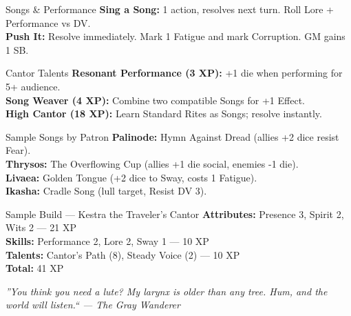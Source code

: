 \documentclass[10pt]{article}
\begin{document}
\begin{minipage}[t]{0.48\linewidth}
    \begin{charbox}{Songs \& Performance}
        \textbf{Sing a Song:} 1 action, resolves next turn. Roll Lore + Performance vs DV.\\
        \textbf{Push It:} Resolve immediately. Mark 1 Fatigue and mark Corruption. GM gains 1 SB.
    \end{charbox}
    
    \vspace{0.5em}
    
    \begin{charbox}{Cantor Talents}
        \textbf{Resonant Performance (3 XP):} +1 die when performing for 5+ audience.\\
        \textbf{Song Weaver (4 XP):} Combine two compatible Songs for +1 Effect.\\
        \textbf{High Cantor (18 XP):} Learn Standard Rites as Songs; resolve instantly.
    \end{charbox}
    
    \vspace{0.5em}
    
    \begin{charbox}{Sample Songs by Patron}
        \textbf{Palinode:} Hymn Against Dread (allies +2 dice resist Fear).\\
        \textbf{Thrysos:} The Overflowing Cup (allies +1 die social, enemies -1 die).\\
        \textbf{Livaea:} Golden Tongue (+2 dice to Sway, costs 1 Fatigue).\\
        \textbf{Ikasha:} Cradle Song (lull target, Resist DV 3).
    \end{charbox}
    
    \vspace{0.5em}
    
    \begin{charbox}{Sample Build --- Kestra the Traveler's Cantor}
        \textbf{Attributes:} Presence 3, Spirit 2, Wits 2 --- 21 XP\\
        \textbf{Skills:} Performance 2, Lore 2, Sway 1 --- 10 XP\\
        \textbf{Talents:} Cantor's Path (8), Steady Voice (2) --- 10 XP\\
        \textbf{Total:} 41 XP
    \end{charbox}
\end{minipage}

\vspace{0.5em}
\begin{center}
    {\small\sffamily\itshape ''You think you need a lute? My larynx is older than any tree. Hum, and the world will listen.`` --- The Gray Wanderer}
\end{center}
\end{document}
